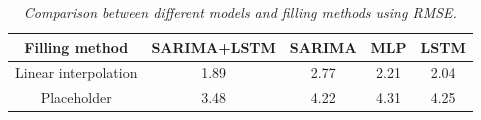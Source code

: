 \begin{table}
 \begin{tabular}{|c|c|c|c|c|} 
 \hline
 Filling method & SARIMA+LSTM & SARIMA & MLP & LSTM \\
 \hline \hline
 Linear interpolation & 1.89 & 2.77 & 2.21 & 2.04\\
 Placeholder & 3.48 & 4.22 & 4.31 & 4.25\\
 \hline
 \end{tabular}
 \caption{\textit{Comparison between different models and filling methods using RMSE.}}
 \label{table:RMSE}
\end{table}








